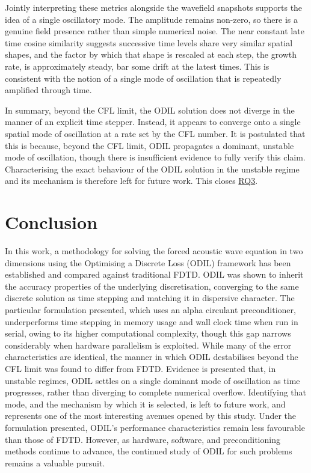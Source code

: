 \documentclass[final-report]{report-template}
\begin{document}
\newpage
Jointly interpreting these metrics alongside the wavefield snapshots supports the idea of a single oscillatory mode. The amplitude remains non-zero, so there is a genuine field presence rather than simple numerical noise. The near constant late time cosine similarity suggests successive time levels share very similar spatial shapes, and the factor by which that shape is rescaled at each step, the growth rate, is approximately steady, bar some drift at the latest times. This is consistent with the notion of a single mode of oscillation that is repeatedly amplified through time.

In summary, beyond the CFL limit, the ODIL solution does not diverge in the manner of an explicit time stepper. Instead, it appears to converge onto a single spatial mode of oscillation at a rate set by the CFL number. It is postulated that this is because, beyond the CFL limit, ODIL propagates a dominant, unstable mode of oscillation, though there is insufficient evidence to fully verify this claim. Characterising the exact behaviour of the ODIL solution in the unstable regime and its mechanism is therefore left for future work. This closes \hyperref[rq:3]{RQ3}.  

\newpage
\section{Conclusion}

In this work, a methodology for solving the forced acoustic wave equation in two dimensions using the Optimising a Discrete Loss (ODIL) framework has been established and compared against traditional FDTD. ODIL was shown to inherit the accuracy properties of the underlying discretisation, converging to the same discrete solution as time stepping and matching it in dispersive character. The particular formulation presented, which uses an alpha circulant preconditioner, underperforms time stepping in memory usage and wall clock time when run in serial, owing to its higher computational complexity, though this gap narrows considerably when hardware parallelism is exploited. While many of the error characteristics are identical, the manner in which ODIL destabilises beyond the CFL limit was found to differ from FDTD. Evidence is presented that, in unstable regimes, ODIL settles on a single dominant mode of oscillation as time progresses, rather than diverging to complete numerical overflow. Identifying that mode, and the mechanism by which it is selected, is left to future work, and represents one of the most interesting avenues opened by this study. Under the formulation presented, ODIL's performance characteristics remain less favourable than those of FDTD. However, as hardware, software, and preconditioning methods continue to advance, the continued study of ODIL for such problems remains a valuable pursuit.
\end{document}
